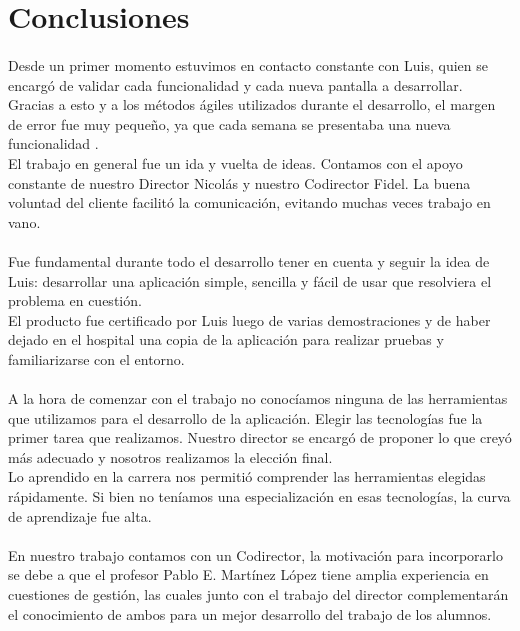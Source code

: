 \section{Conclusiones}


\paragraph{}
Desde un primer momento estuvimos en contacto constante con Luis, quien se encargó de validar cada funcionalidad y cada nueva pantalla a desarrollar. Gracias a esto y a los métodos ágiles utilizados durante el desarrollo, el margen de error fue muy pequeño, ya que cada semana se presentaba una nueva funcionalidad .\\
El trabajo en general fue un ida y vuelta de ideas. Contamos con el apoyo constante de nuestro Director Nicolás y nuestro Codirector Fidel. La buena voluntad del cliente facilitó la comunicación, evitando muchas veces trabajo en vano.\\

\paragraph{}
Fue fundamental durante todo el desarrollo tener en cuenta y seguir la idea de Luis: desarrollar una aplicación simple, sencilla y fácil de usar que resolviera el problema en cuestión.\\
El producto fue certificado por Luis luego de varias demostraciones y de haber dejado en el hospital una copia de la aplicación para realizar pruebas y familiarizarse con el entorno.

\paragraph{}
A la hora de comenzar con el trabajo no conocíamos ninguna de las herramientas que utilizamos para el desarrollo de la aplicación. Elegir las tecnologías fue la primer tarea que realizamos. Nuestro director se encargó de proponer lo que creyó más adecuado y nosotros realizamos la elección final.\\
Lo aprendido en la carrera nos permitió comprender las herramientas elegidas rápidamente. Si bien no teníamos una especialización en esas tecnologías, la curva de aprendizaje fue alta. 


\paragraph{}
En nuestro trabajo contamos con un Codirector, la motivación para incorporarlo se debe a que el profesor Pablo E. Martínez López tiene amplia experiencia en cuestiones de gestión, las cuales junto con el trabajo del director complementarán el conocimiento de ambos para un mejor desarrollo del trabajo de los alumnos.

